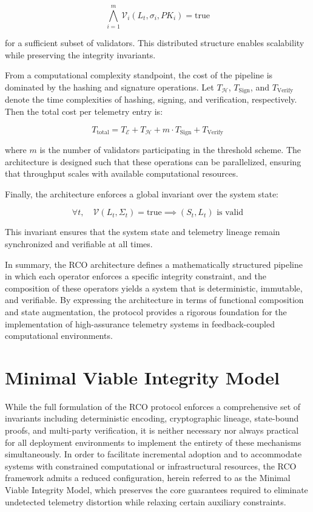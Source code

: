 \begin{equation}
\bigwedge_{i=1}^{m} \mathcal{V}_i(L_t, \sigma_i, PK_i) = \text{true}
\end{equation}

for a sufficient subset of validators. This distributed structure enables scalability while preserving the integrity invariants.

From a computational complexity standpoint, the cost of the pipeline is dominated by the hashing and signature operations. Let $T_{\mathcal{H}}$, $T_{\text{Sign}}$, and $T_{\text{Verify}}$ denote the time complexities of hashing, signing, and verification, respectively. Then the total cost per telemetry entry is:

\begin{equation}
T_{\text{total}} = T_{\mathcal{E}} + T_{\mathcal{H}} + m \cdot T_{\text{Sign}} + T_{\text{Verify}}
\end{equation}

where $m$ is the number of validators participating in the threshold scheme. The architecture is designed such that these operations can be parallelized, ensuring that throughput scales with available computational resources.

Finally, the architecture enforces a global invariant over the system state:

\begin{equation}
\forall t, \quad \mathcal{V}(L_t, \Sigma_t) = \text{true} \implies (S_t, L_t) \text{ is valid}
\end{equation}

This invariant ensures that the system state and telemetry lineage remain synchronized and verifiable at all times.

In summary, the RCO architecture defines a mathematically structured pipeline in which each operator enforces a specific integrity constraint, and the composition of these operators yields a system that is deterministic, immutable, and verifiable. By expressing the architecture in terms of functional composition and state augmentation, the protocol provides a rigorous foundation for the implementation of high-assurance telemetry systems in feedback-coupled computational environments.

\section{Minimal Viable Integrity Model}

While the full formulation of the RCO protocol enforces a comprehensive set of invariants including deterministic encoding, cryptographic lineage, state-bound proofs, and multi-party verification, it is neither necessary nor always practical for all deployment environments to implement the entirety of these mechanisms simultaneously. In order to facilitate incremental adoption and to accommodate systems with constrained computational or infrastructural resources, the RCO framework admits a reduced configuration, herein referred to as the Minimal Viable Integrity Model, which preserves the core guarantees required to eliminate undetected telemetry distortion while relaxing certain auxiliary constraints.

